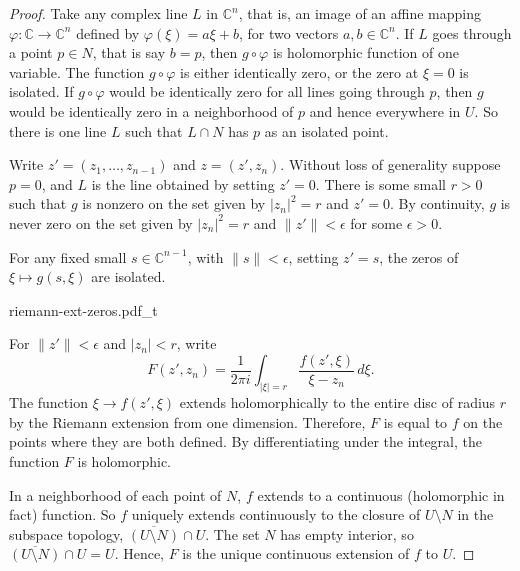 \documentclass[12pt,openany]{book}
\newcommand{\sabs}[1]{\lvert {#1} \rvert}
\newcommand{\snorm}[1]{\lVert {#1} \rVert}
\newcommand{\abs}[1]{\left\lvert {#1} \right\rvert}
\newcommand{\C}{{\mathbb{C}}}
\theoremstyle{plain}
\theoremstyle{remark}
\theoremstyle{definition}
\theoremstyle{exercise}
\theoremstyle{example}
\newcommand{\exerciseref}[1]{\hyperref[#1]{Exercise~\ref*{#1}}}
\begin{document}
\begin{proof}
Take any complex line $L$ in $\C^n$, that is, an image of an affine mapping
$\varphi \colon \C \to \C^n$ defined by
$\varphi(\xi) = a\xi + b$, for two vectors $a,b \in \C^n$.
If $L$ goes through a point $p \in N$, that is say $b=p$,
then $g \circ \varphi$ is
holomorphic function of one variable.  The function $g \circ \varphi$
is either identically zero, or
the zero at $\xi=0$ is isolated.
If $g \circ \varphi$ would be identically zero for all lines going through
$p$, then $g$ would be identically zero in a neighborhood of $p$ and hence
everywhere in $U$.  So there is one line $L$ such that $L \cap N$ has $p$
as an isolated point.

Write $z' =
(z_1,\ldots,z_{n-1})$ and $z=(z',z_n)$.
Without loss of generality suppose $p = 0$, and $L$ is the line
obtained by setting $z' = 0$.
There is some small
$r > 0$ such that $g$ is nonzero on the set
given by $\sabs{z_n}^2 = r$ and $z' = 0$.
By continuity,
$g$ is never zero on the set given by
$\sabs{z_n}^2 = r$ and $\snorm{z'} <\epsilon$ for some $\epsilon >0$.

For any fixed small $s \in \C^{n-1}$, with $\snorm{s} < \epsilon$,
setting $z' = s$,
the zeros of $\xi \mapsto g(s,\xi)$ are isolated.

\begin{center}
{riemann-ext-zeros.pdf_t}
\end{center}

For $\snorm{z'} <
\epsilon$ and $\abs{z_n} < r$, write
\begin{equation*}
F(z',z_n) =
\frac{1}{2\pi i}
\int_{\sabs{\xi}=r} \frac{f(z',\xi)}{\xi-z_n} \,d\xi .
\end{equation*}
The function $\xi \to f(z',\xi)$ extends holomorphically to the entire
disc of radius $r$ by the Riemann extension from one dimension.  Therefore,
$F$ is equal to $f$ on the points where they are both defined.
By differentiating under the integral, the function $F$ is holomorphic.

In a neighborhood of each point of 
$N$, $f$ extends to a continuous (holomorphic in fact) function.
So $f$ uniquely extends continuously to the closure of
$U \setminus N$ in the subspace topology,
$\overline{(U \setminus N)} \cap U$.  The set $N$ has empty interior,
so $\overline{(U \setminus N)} \cap U = U$.  Hence, $F$ is the unique
continuous extension of $f$ to $U$.
\end{proof}
\end{document}
